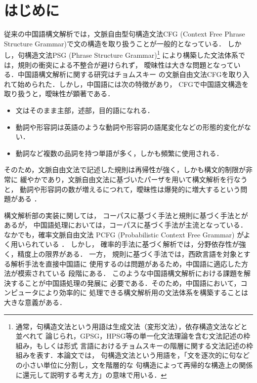 \documentclass[japanese]{jnlp_1.3a}
\begin{document}
\maketitle




\section{はじめに}

従来の中国語構文解析では，文脈自由型句構造文法CFG (Context Free Phrase Structure
Grammar)で文の構造を取り扱うことが一般的となっている．
しかし，句構造文法PSG (Phrase Structure Grammar)\footnote[1]{
通常，句構造文法という用語は生成文法（変形文法），依存構造文法などと並べれて
論じられ，GPSG，HPSG等の単一化文法理論を含む文法記述の枠組み，もしくは形式
言語におけるチョムスキーの階層に関する文法記述の枠組みを表す．本論文では，
句構造文法という用語を，「文を逐次的に句などの小さい単位に分割し，文を階層的な
句構造によって再帰的な構造上の関係に還元して説明する考え方」の意味で用いる．
}
により構築した文法体系では，規則の衝突による不整合が避けられず，
曖昧性は大きな問題となっている．中国語構文解析に関する研究はチョムスキー
の文脈自由文法CFGを取り入れて始められた．しかし，中国語には次の特徴があり，
CFGで中国語文構造を取り扱うと，曖昧性が顕著である．


\begin{itemize}
\item 文はそのまま主部，述部，目的語になれる\cite{zhu1}．
\item 動詞や形容詞は英語のような動詞や形容詞の語尾変化などの形態的変化がない\cite{zhu1}．
\item 動詞など複数の品詞を持つ単語が多く，しかも頻繁に使用される\cite{zhou2}．
\end{itemize}
そのため，文脈自由文法で記述した規則は再帰性が強く，しかも構文的制限が非常に
緩やかであり，文脈自由文法に基づいたパーザを用いて構文解析を行なうと，
動詞や形容詞の数が増えるにつれて，曖昧性は爆発的に増大するという問題がある
\cite{masterpaper}
\cite{yang}．

構文解析部の実装に関しては，
コーパスに基づく手法と規則に基づく手法とがあるが，
中国語処理においては，コーパスに基づく手法が主流となっている\cite{huang}．
なかでも，確率文脈自由文法
PCFG (Probabilistic Context Free Grammar)
がよく用いられている
\cite{ictprop1}\cite{xiong}\cite{linying}\cite{chenxiaohui}．
しかし，
確率的手法に基づく解析では，分野依存性が強く，精度上の限界がある．
一方，
規則に基づく手法では，西欧言語を対象とする解析手法を直接中国語に
使用するのは問題があるため，中国語に適応した方法が模索されている
段階にある\cite{zhang}．
このような中国語構文解析における課題を解決することが中国語処理の発展に
必要である．そのため，中国語において，コンピュータにより効率的に
処理できる構文解析用の文法体系を構築することは大きな意義がある．
\end{document}
